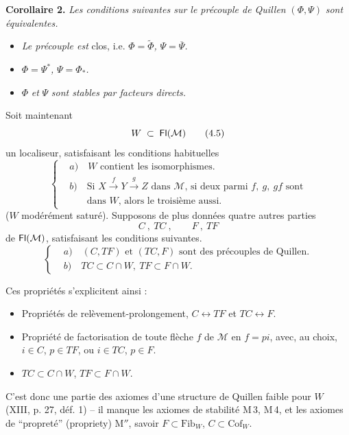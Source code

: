 \textbf{Corollaire 2.} \textit{Les conditions suivantes sur le précouple de Quillen} $(\Phi,\Psi)$ \textit{sont équivalentes.}
\begin{itemize}[leftmargin=2.5em]
\item[a)] \textit{Le précouple est} clos, i.e. $\Phi=\widetilde{\Phi}$\textit{,} $\Psi=\overline{\Psi}$\textit{.}
\item[b)] $\Phi=\Psi^*$\textit{,} $\Psi=\Phi_*$\textit{.}
\item[c)] $\Phi$ \textit{et} $\Psi$ \textit{sont stables par facteurs directs.}
\end{itemize}
Soit maintenant
\[
W \;\subset\; \Fl(\mathcal{M})
\tag*{(4.5)}
\]
un localiseur, satisfaisant les conditions habituelles
\[
\left\{
\begin{aligned}
&\textit{a})\quad W \text{ contient les isomorphismes.}\\[1ex]
&\textit{b})\quad \text{Si } X\xrightarrow{\;f\;}Y\xrightarrow{\;g\;}Z \text{ dans } \mathcal{M}\text{, si deux parmi } f,\ g,\ gf \text{ sont}\\
&\phantom{\textit{b})}\quad \text{dans } W\text{, alors le troisième aussi.}
\end{aligned}
\right.
\tag*{(4.6)}
\]
($W$ modérément saturé). Supposons de plus données quatre autres parties
\[
C\ ,\ TC\ , \qquad F\ ,\ TF
\tag*{(4.7)}
\]
de $\mathsf{Fl}(\mathcal{M})$, satisfaisant les conditions suivantes.
\[
\left\{
\begin{aligned}
&\textit{a})\quad (C,TF) \text{ et } (TC,F) \text{ sont des précouples de Quillen.}\\[1ex]
&\textit{b})\quad TC\subset C\cap W,\ TF\subset F\cap W.
\end{aligned}
\right.
\tag*{(4.8)}
\]

Ces propriétés s'explicitent ainsi :
\begin{itemize}[leftmargin=2.5em]
\item[\textbf{M\,1}] Propriétés de relèvement-prolongement, $C\longleftrightarrow TF$ et $TC\longleftrightarrow F$.
\item[\textbf{M\,2}] Propriété de factorisation de toute flèche $f$ de $\mathcal{M}$ en $f=pi$, avec, au choix, $i\in C$, $p\in TF$, ou $i\in TC$, $p\in F$.
\item[\textbf{M$'$}] $TC\subset C\cap W$, $TF\subset F\cap W$.
\end{itemize}

C'est donc une partie des axiomes d'une structure de Quillen faible pour $W$ (XIII, p. 27, déf. 1) -- il manque les axiomes de stabilité M\,3, M\,4, et les axiomes de “propreté” (propriety) M$''$, savoir $F\subset\mathrm{Fib}_W$, $C\subset\mathrm{Cof}_W$.

